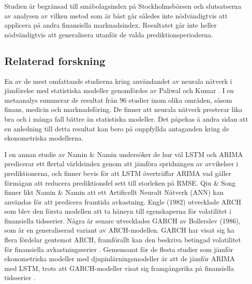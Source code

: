 \documentclass[11pt]{article}
\numberwithin{equation}{section}
\numberwithin{table}{section}
\numberwithin{figure}{section}
\begin{document}
Studien är begränsad till småbolagsindex på Stockholmsbörsen och slutsatserna av analysen av vilken metod som är bäst går således inte nödvändigtvis att applicera på andra finansiella marknadsindex. Resultatet går inte heller nödvändigtvis att generalisera utanför de valda prediktionsperioderna.




\subsection{Relaterad forskning}

En av de mest omfattande studierna kring användandet av neurala nätverk i jämförelse med statistiska modeller genomfördes av Paliwal och Kumar \parencite*{paliwal2009neural}. I en metaanalys summerar de resultat från 96 studier inom olika områden, såsom finans, medicin och marknadsföring. De finner att neurala nätverk presterar lika bra och i många fall bättre än statistiska modeller. Det påpekas å andra sidan att en anledning till detta resultat kan bero på ouppfyllda antaganden kring de ekonometriska modellerna. 

I en annan studie av Namin \& Namin \parencite*{siaminamini2018forecasting} undersöker de hur väl LSTM och ARIMA predicerar ett flertal världsindex genom att jämföra spridningen av avvikelser i prediktionerna, och finner bevis för att LSTM överträffar ARIMA vad gäller förmågan att reducera prediktionsfel sett till storleken på RMSE. Qiu \& Song \parencite*{10.1371/journal.pone.0155133} finner likt Namin \& Namin \parencite*{siaminamini2018forecasting} att ett Artificellt Neuralt Nätverk (ANN) kan användas för att predicera framtida avkastning. Engle (1982) utvecklade ARCH som blev den första modellen att ta hänsyn till egenskaperna för volatilitet i finansiella tidsserier. Några år senare utvecklades GARCH av Bollerslev (1986), som är en generaliserad variant av ARCH-modellen. GARCH har visat sig ha flera fördelar gentemot ARCH, framförallt kan den beskriva betingad volatilitet för finansiella avkastningsserier \parencite[][,s.131-132.]{tsay}. Gemensamt för de flesta studier som jämför ekonometriska modeller med djupinlärningsmodeller är att de jämför ARIMA med LSTM, trots att GARCH-modeller visat sig framgångsrika på finansiella tidsserier \parencite{garch}.
\end{document}

